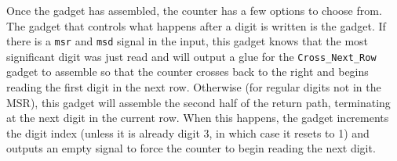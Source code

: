 \subsubsection{\nextread}

Once the {\returnpath} gadget has assembled, the counter has a few options to choose from.
%
The gadget that controls what happens after a digit is written is the {\nextread} gadget.
%
If there is a {\tt msr} and {\tt msd} signal in the input, this gadget knows that the most significant digit was just read and will output a
glue for the {\tt Cross\_Next\_Row} gadget to assemble so that the counter crosses
back to the right and begins reading the first digit in the next row.
%
Otherwise (for regular digits not in the MSR), this gadget will assemble the second half of
the return path, terminating at the next digit in the current row.
%
When this happens, the gadget increments the digit index (unless it is already digit 3, in which case it
resets to 1) and outputs an empty {\cread} signal to force the counter to begin reading
the next digit.



